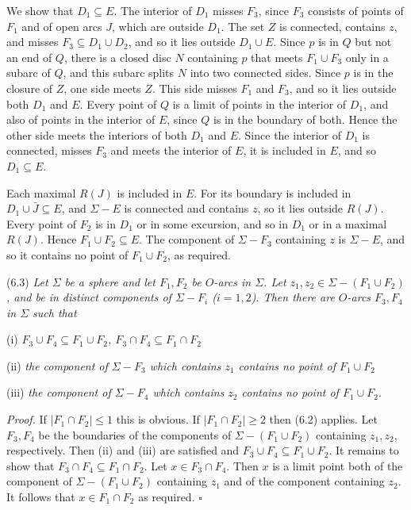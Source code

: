 {We show that $D_1 \subseteq E$. The interior of $D_1$ misses $F_3$, since $F_3$ consists of points of
$F_1$ and of open arcs $J$, which are outside $D_1$. The set $Z$ is connected, contains $z$, and
misses $F_3 \subseteq D_1 \cup D_2$, and so it lies outside $D_1 \cup E$. Since $p$ is in $Q$ but not an end of $Q$, there is
a closed disc $N$ containing $p$ that meets $F_1 \cup F_3$ only in a subarc of $Q$, and this subarc
splits $N$ into two connected sides. Since $p$ is in the closure of $Z$, one side meets $Z$. This
side misses $F_1$ and $F_3$, and so it lies outside both $D_1$ and $E$. Every point of $Q$ is a limit
of points in the interior of $D_1$, and also of points in the interior of $E$, since $Q$ is in the
boundary of both. Hence the other side meets the interiors of both $D_1$ and $E$. Since the interior of $D_1$ is connected, misses $F_3$ and meets the interior of $E$, it is
included in $E$, and so $D_1 \subseteq E$.

Each maximal $R(J)$ is included in $E$. For its boundary is included in
$D_1 \cup \bar{J} \subseteq E$, and $\Sigma - E$ is connected and contains $z$, so it lies outside
$R(J)$. Every point of $F_2$ is in $D_1$ or in some excursion, and so in $D_1$ or in a maximal
$R(J)$. Hence $F_1 \cup F_2 \subseteq E$. The component of $\Sigma - F_3$ containing $z$ is
$\Sigma - E$, and so it contains no point of $F_1 \cup F_2$, as
required.}

\stmt
(6.3) \textit{Let $\Sigma$ be a sphere and let $F_1, F_2$ be $O$-arcs in $\Sigma$. Let $z_1, z_2 \in \Sigma - (F_1 \cup F_2)$, and be in distinct components of $\Sigma - F_i$ ($i = 1, 2$). Then there are $O$-arcs $F_3, F_4$ in $\Sigma$ such that}

\hspace*{12pt}(i) \textit{$F_3 \cup F_4 \subseteq F_1 \cup F_2$, $F_3 \cap F_4 \subseteq F_1 \cap F_2$}

\hspace*{12pt}(ii) \textit{the component of $\Sigma - F_3$ which contains $z_1$ contains no point of $F_1 \cup F_2$}

\hspace*{12pt}(iii) \textit{the component of $\Sigma - F_4$ which contains $z_2$ contains no point of $F_1 \cup F_2$.}

\textit{Proof.} If $|F_1 \cap F_2| \le 1$ this is obvious. If $|F_1 \cap F_2| \ge 2$ then (6.2) applies. Let $F_3, F_4$ be the boundaries of the components of $\Sigma - (F_1 \cup F_2)$ containing $z_1, z_2$, respectively. Then (ii) and (iii) are satisfied and $F_3 \cup F_4 \subseteq F_1 \cup F_2$. It remains to show that $F_3 \cap F_4 \subseteq F_1 \cap F_2$. Let $x \in F_3 \cap F_4$. Then $x$ is a limit point both of the component of $\Sigma - (F_1 \cup F_2)$ containing $z_1$ and of the component containing $z_2$. It follows that $x \in F_1 \cap F_2$ as required. $\square$

